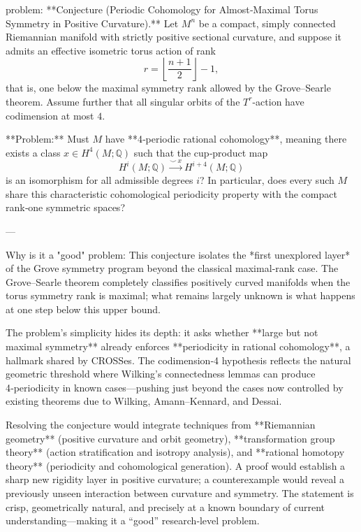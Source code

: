 problem:  
**Conjecture (Periodic Cohomology for Almost‑Maximal Torus Symmetry in Positive Curvature).**  
Let \( M^n \) be a compact, simply connected Riemannian manifold with strictly positive sectional curvature, and suppose it admits an effective isometric torus action of rank  
\[
r = \left\lfloor \frac{n+1}{2} \right\rfloor - 1,
\]  
that is, one below the maximal symmetry rank allowed by the Grove–Searle theorem.  
Assume further that all singular orbits of the \(T^r\)-action have codimension at most \(4\).

**Problem:**  
Must \(M\) have **4‑periodic rational cohomology**, meaning there exists a class \(x \in H^4(M;\mathbb{Q})\) such that the cup‑product map  
\[
H^i(M;\mathbb{Q}) \xrightarrow{\smile\, x} H^{i+4}(M;\mathbb{Q})
\]  
is an isomorphism for all admissible degrees \(i\)?  
In particular, does every such \(M\) share this characteristic cohomological periodicity property with the compact rank‑one symmetric spaces?

---

Why is it a "good" problem:  
This conjecture isolates the *first unexplored layer* of the Grove symmetry program beyond the classical maximal‑rank case. The Grove–Searle theorem completely classifies positively curved manifolds when the torus symmetry rank is maximal; what remains largely unknown is what happens at one step below this upper bound.

The problem’s simplicity hides its depth: it asks whether **large but not maximal symmetry** already enforces **periodicity in rational cohomology**, a hallmark shared by CROSSes. The codimension‑4 hypothesis reflects the natural geometric threshold where Wilking’s connectedness lemmas can produce 4‑periodicity in known cases—pushing just beyond the cases now controlled by existing theorems due to Wilking, Amann–Kennard, and Dessai.  

Resolving the conjecture would integrate techniques from **Riemannian geometry** (positive curvature and orbit geometry), **transformation group theory** (action stratification and isotropy analysis), and **rational homotopy theory** (periodicity and cohomological generation).  
A proof would establish a sharp new rigidity layer in positive curvature; a counterexample would reveal a previously unseen interaction between curvature and symmetry. The statement is crisp, geometrically natural, and precisely at a known boundary of current understanding—making it a “good” research‑level problem.